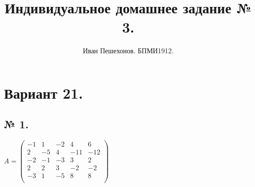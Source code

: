 \documentclass[a4paper,11pt]{report}
\title{Индивидуальное домашнее задание № 3.}
\author{Иван Пешехонов. БПМИ1912.}
\begin{document}
\maketitle
\chapter{Вариант 21.}
\section{№ 1.}
$
A = 
\begin{pmatrix}
-1 & 1 & -2 & 4 & 6\\
2 & -5 & 4 & -11 & -12\\
-2 & -1 & -3 & 3 & 2\\
2 & 2 & 3 & -2 & -2\\
-3 & 1 & -5 & 8 & 8\\
\end{pmatrix}
$\\
\end{document}
